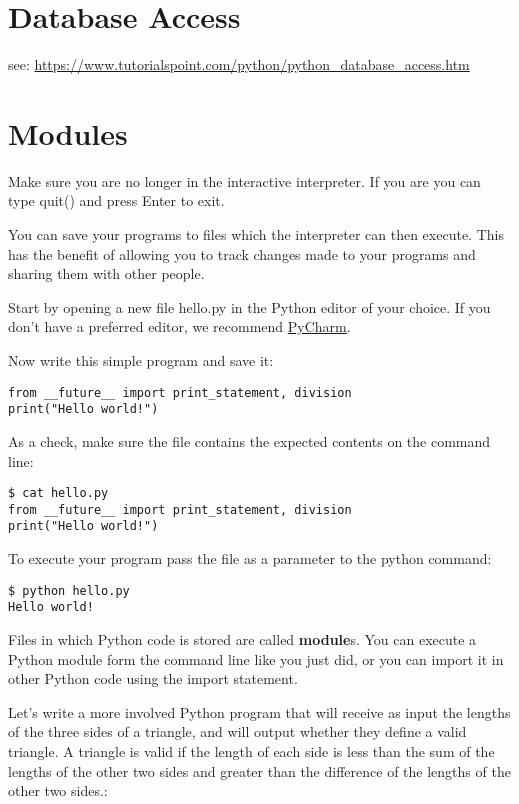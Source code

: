 
\section{Database Access}\label{database-access}

see:
\url{https://www.tutorialspoint.com/python/python_database_access.htm}

\section{Modules}\label{modules}

Make sure you are no longer in the interactive interpreter. If you are
you can type quit() and press Enter to exit.

You can save your programs to files which the interpreter can then
execute. This has the benefit of allowing you to track changes made to
your programs and sharing them with other people.

Start by opening a new file hello.py in the Python editor of your
choice. If you don't have a preferred editor, we recommend
\href{https://www.jetbrains.com/pycharm/}{PyCharm}.

Now write this simple program and save it:

\begin{verbatim}
from __future__ import print_statement, division
print("Hello world!")
\end{verbatim}

As a check, make sure the file contains the expected contents on the
command line:

\begin{verbatim}
$ cat hello.py
from __future__ import print_statement, division
print("Hello world!")
\end{verbatim}

To execute your program pass the file as a parameter to the python
command:

\begin{verbatim}
$ python hello.py
Hello world!
\end{verbatim}

Files in which Python code is stored are called \textbf{module}s. You
can execute a Python module form the command line like you just did, or
you can import it in other Python code using the import statement.

Let's write a more involved Python program that will receive as input
the lengths of the three sides of a triangle, and will output whether
they define a valid triangle. A triangle is valid if the length of each
side is less than the sum of the lengths of the other two sides and
greater than the difference of the lengths of the other two sides.:

